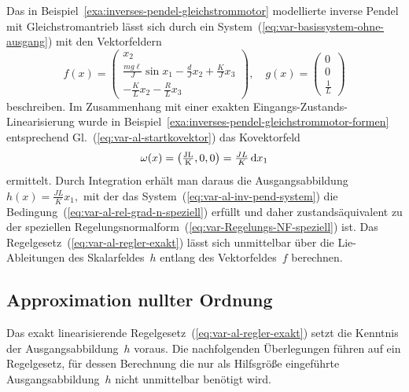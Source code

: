 \begin{example}
\label{exa:Inverses-Pendel-Approx-Exakt}Das in Beispiel~\ref{exa:inverses-pendel-gleichstrommotor}
modellierte inverse Pendel mit Gleich\-strom\-antrieb lässt sich
durch ein System~(\ref{eq:var-basissystem-ohne-ausgang}) mit den
Vektorfeldern
\begin{equation}
f(x)=\left(\begin{array}{c}
x_{2}\\
\frac{mg\ell}{J}\sin x_{1}-\frac{d}{J}x_{2}+\frac{K}{J}x_{3}\\
-\frac{K}{L}x_{2}-\frac{R}{L}x_{3}
\end{array}\right),\quad g(x)=\left(\begin{array}{c}
0\\
0\\
\frac{1}{L}
\end{array}\right)\label{eq:var-al-inv-pend-system}
\end{equation}
beschreiben. Im Zusammenhang mit einer exakten Eingangs-Zustands-Linearisierung
wurde in Beispiel~\ref{exa:inverses-pendel-gleichstrommotor-formen}
entsprechend Gl.~(\ref{eq:var-al-startkovektor}) das Kovektorfeld
\begin{equation}
\omega(x)=\left(\unit{\tfrac{JL}{K}},0,0\right)=\tfrac{JL}{K}\,\d x_{1}\label{eq:var-al-inv-pend-omega}
\end{equation}
ermittelt. Durch Integration erhält man daraus die Ausgangsabbildung
$h(x)=\tfrac{JL}{K}x_{1},$ mit der das System~(\ref{eq:var-al-inv-pend-system})
die Bedingung~(\ref{eq:var-al-rel-grad-n-speziell}) erfüllt und
daher zustandsäquivalent zu der speziellen Regelungsnormalform~(\ref{eq:var-Regelungs-NF-speziell})
ist. Das Regelgesetz~(\ref{eq:var-al-regler-exakt}) lässt sich unmittelbar
über die Lie-Ableitungen des Skalarfeldes~$h$ entlang des Vektorfeldes~$f$
berechnen.
\end{example}

\subsection{Approximation nullter Ordnung\label{subsec:Approx-nullter-Ordnung}}

Das exakt linearisierende Regelgesetz~(\ref{eq:var-al-regler-exakt})
setzt die Kenntnis der Ausgangsabbildung~$h$ voraus. Die nachfolgenden
Überlegungen führen auf ein Regelgesetz, für dessen Berechnung die
nur als Hilfsgröße eingeführte Ausgangsabbildung~$h$ nicht unmittelbar
benötigt wird.


